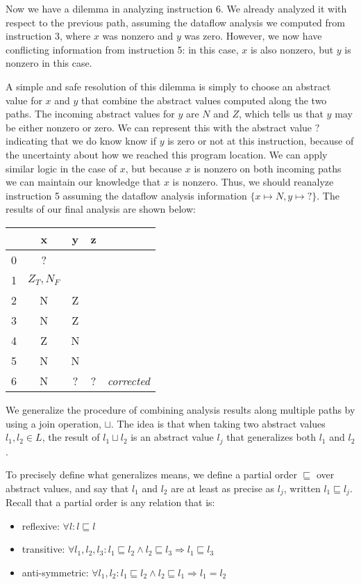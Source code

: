\documentclass[11pt]{article}
\def\tablespace{\vspace{2ex}}
\def\implies{\Rightarrow}
\newcommand{\join}{\sqcup}
\newcommand{\alap}{\sqsubseteq}
\begin{document}
Now we have a dilemma in analyzing instruction 6.  We already analyzed it with
respect to the previous path, assuming the dataflow analysis we computed from
instruction 3, where $x$ was nonzero and $y$ was zero.  However, we now have
conflicting information from instruction 5: in this case, $x$ is also nonzero,
but $y$ is nonzero in this case.  

A simple and safe resolution of this dilemma is simply to choose an abstract
value for $x$ and $y$ that combine the abstract values computed along the two
paths.  The incoming abstract values for $y$ are $N$ and $Z$, which tells us
that $y$ may be either nonzero or zero. We can represent this with the abstract
value $?$ indicating that we do know know if $y$ is zero or not at this
instruction, because of the uncertainty about how we reached this program
location.  We can apply similar logic in the case of $x$, but because $x$ is
nonzero on both incoming paths we can maintain our knowledge that $x$ is
nonzero.  Thus, we should reanalyze instruction 5 assuming the dataflow analysis
information $\{x \mapsto N, y \mapsto {?}\}$.  The results of our final analysis
are shown below:

\tablespace
\begin{tabular}{r | c c c l}

  & x & y & z \\
\hline
0 & ? &   &  \\
1 & $Z_T,N_F$ &   &  \\
2 & N & Z &  \\
3 & N & Z &  \\
4 & Z & N &  \\
5 & N & N &  \\
6 & N & ? & ? & \textit{corrected}\\

\end{tabular}
\tablespace

We generalize the procedure of combining analysis results along multiple paths
by using a join operation, $\join$.  The idea is that when taking two abstract
values $l_1, l_2 \in L$, the result of $l_1 \join l_2$ is an abstract value
$l_j$ that generalizes both $l_1$ and $l_2$.

To precisely define what generalizes means, we define a partial order $\alap$
over abstract values, and say that $l_1$ and $l_2$ are at least as precise as
$l_j$, written $l_1 \alap l_j$.  Recall that a partial order is any relation
that is:

\begin{itemize}[labelwidth=0.7em, labelsep=0.6em, topsep=0ex, itemsep=0ex,
  parsep=0ex] 
\item reflexive: $\forall l : l \alap l$
\item transitive: $\forall l_1, l_2, l_3 : l_1 \alap l_2 \land l_2 \alap l_3 \implies l_1 \alap l_3$
\item anti-symmetric: $\forall l_1, l_2 : l_1 \alap l_2 \land l_2 \alap l_1 \implies l_1 = l_2$
\end{itemize}
\end{document}
